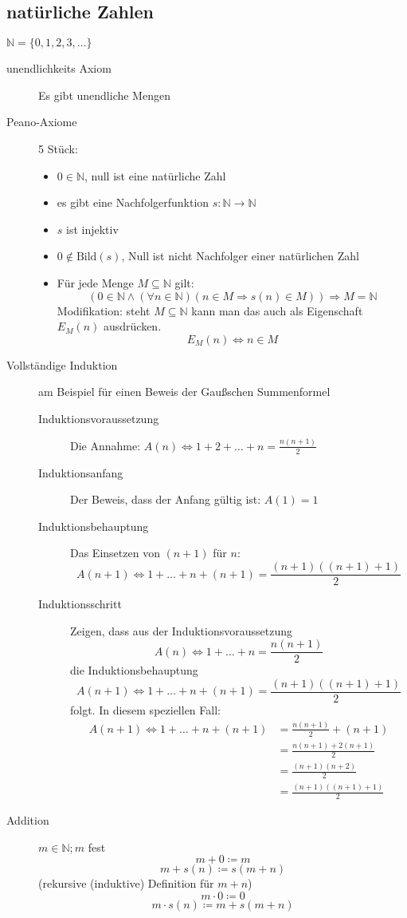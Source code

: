 \documentclass[12pt,a4paper]{article}
\begin{document}
\subsection{natürliche Zahlen}
$\mathbb{N} = \lbrace 0, 1, 2, 3, \dots \rbrace$
\begin{description}
	\item[unendlichkeits Axiom] Es gibt unendliche Mengen
	\item[Peano-Axiome] 5 Stück:
		\begin{itemize}
			\item $0 \in \mathbb{N}$, null ist eine natürliche Zahl
			\item es gibt eine Nachfolgerfunktion $s : \mathbb{N} \longrightarrow \mathbb{N}$
			\item $s$ ist injektiv
			\item $0 \not \in \textrm{Bild}(s)$, Null ist nicht Nachfolger einer natürlichen Zahl
			\item Für jede Menge $M \subseteq \mathbb{N}$ gilt:
			      $$(0 \in \mathbb{N} \wedge (\forall n \in \mathbb{N})(n \in M \Rightarrow s(n) \in M)) \Rightarrow M = \mathbb{N}$$
			      Modifikation: steht $M \subseteq \mathbb{N}$ kann man das auch als Eigenschaft $E_M(n)$ ausdrücken.
			      $$E_M(n) \Leftrightarrow n \in M$$
		\end{itemize}
	\item[Vollständige Induktion] am Beispiel für einen Beweis der Gaußschen Summenformel
		\begin{description}
			\item[Induktionsvoraussetzung] Die Annahme: $A(n) \Leftrightarrow 1 + 2 + \dots + n = \frac{n(n+1)}{2}$
			\item[Induktionsanfang] Der Beweis, dass der Anfang gültig ist: $A(1) = 1$
			\item[Induktionsbehauptung] Das Einsetzen von $(n + 1)$ für $n$:
				$$A(n + 1) \Leftrightarrow 1 + \dots + n + (n + 1)= \frac{(n + 1)((n + 1)+1)}{2}$$
			\item[Induktionsschritt] Zeigen, dass aus der Induktionsvoraussetzung
				$$A(n) \Leftrightarrow 1 + \dots + n = \frac{n(n+1)}{2}$$
				die Induktionsbehauptung
				$$A(n + 1) \Leftrightarrow 1 + \dots + n + (n + 1) = \frac{(n + 1)((n + 1)+1)}{2}$$
				folgt. In diesem speziellen Fall:
				\begin{align*}
					A(n + 1) \Leftrightarrow 1 + \dots + n + (n + 1) & = \frac{n(n + 1)}{2} + (n + 1)  \\
					                                                 & = \frac{n(n + 1) + 2(n + 1)}{2} \\
					                                                 & = \frac{(n + 1)(n + 2)}{2}      \\
					                                                 & = \frac{(n + 1)((n + 1)+1)}{2}
				\end{align*}
		\end{description}
	\item[Addition] $m \in \mathbb{N}; m$ fest
		$$m+0\coloneqq m$$
		$$m + s(n) \coloneqq s(m + n)$$
		(rekursive (induktive) Definition für $m + n$)
		$$m \cdot 0\coloneqq 0$$
		$$m \cdot s(n) \coloneqq m + s(m + n)$$
\end{description}
\end{document}
